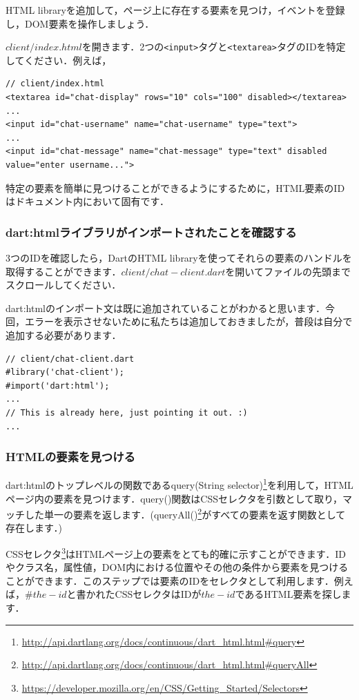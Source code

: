 HTML libraryを追加して，ページ上に存在する要素を見つけ，イベントを登録し，DOM要素を操作しましょう．

$ client/index.html $を開きます．2つの\verb|<input>|タグと\verb|<textarea>|タグのIDを特定してください．例えば，

\begin{verbatim}
// client/index.html
<textarea id="chat-display" rows="10" cols="100" disabled></textarea>
...
<input id="chat-username" name="chat-username" type="text">
...
<input id="chat-message" name="chat-message" type="text" disabled
value="enter username...">
\end{verbatim}

特定の要素を簡単に見つけることができるようにするために，HTML要素のIDはドキュメント内において固有です．

\subsubsection{dart:htmlライブラリがインポートされたことを確認する}

3つのIDを確認したら，DartのHTML libraryを使ってそれらの要素のハンドルを取得することができます．$ client/chat-client.dart $を開いてファイルの先頭までスクロールしてください．

dart:htmlのインポート文は既に追加されていることがわかると思います．今回，エラーを表示させないために私たちは追加しておきましたが，普段は自分で追加する必要があります．

\begin{verbatim}
// client/chat-client.dart
#library('chat-client');
#import('dart:html');
...
// This is already here, just pointing it out. :)
...
\end{verbatim}

\subsubsection{HTMLの要素を見つける}

dart:htmlのトップレベルの関数であるquery(String selector)\footnote{\url{http://api.dartlang.org/docs/continuous/dart\_html.html\#query}}を利用して，HTMLページ内の要素を見つけます．query()関数はCSSセレクタを引数として取り，マッチした単一の要素を返します．(queryAll()\footnote{\url{http://api.dartlang.org/docs/continuous/dart\_html.html\#queryAll}}がすべての要素を返す関数として存在します．)

CSSセレクタ\footnote{\url{https://developer.mozilla.org/en/CSS/Getting\_Started/Selectors}}はHTMLページ上の要素をとても的確に示すことができます．IDやクラス名，属性値，DOM内における位置やその他の条件から要素を見つけることができます．このステップでは要素のIDをセレクタとして利用します．例えば，$ \#the-id $と書かれたCSSセレクタはIDが$ the-id $であるHTML要素を探します．

